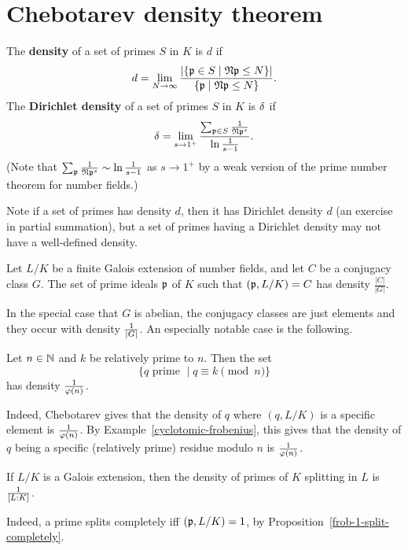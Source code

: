 \section{Chebotarev density theorem}
\begin{df}
The \textbf{density} of a set of primes $S$ in $K$ is $d$ if 
\[
d=\lim_{N\to \infty} \frac{|\{\mathfrak{p} \in S\mid \mathfrak{N}\mathfrak{p}\le N\}|}{\{\mathfrak{p}\mid \mathfrak{N}\mathfrak{p}\le N\}}.
\]
The \textbf{Dirichlet density} of a set of primes $S$ in $K$ is $\delta$ if 
\[
\delta=\lim_{s\to 1^+}\frac{\sum_{\mathfrak{p}\in S}\frac{1}{\mathfrak{N} \mathfrak{p}^s}}{\ln \frac{1}{s-1}}.
\]
(Note that $\sum_{\mathfrak{p}}\frac{1}{\mathfrak{N}\mathfrak{p}^s}\sim \ln \frac{1}{s-1}$ as $s\to 1^+$ by a weak version of the prime number theorem for number fields.)
\end{df}
Note if a set of primes has density $d$, then it has Dirichlet density $d$ (an exercise in partial summation), but a set of primes having a Dirichlet density may not have a well-defined density.
\begin{thm}
Let $L/K$ be a finite Galois extension of number fields, and let $C$ be a conjugacy class $G$. The set of prime ideals $\mathfrak{p}$ of $K$ such that $(\mathfrak{p},L/K)=C$ has density $\frac{|C|}{|G|}$.
\end{thm}
In the special case that $G$ is abelian, the conjugacy classes are just elements and they occur with density $\frac{1}{|G|}$. An especially notable case is the following.
\begin{ex}[Dirichlet]
Let $n\in \mathbb{N}$ and $k$ be relatively prime to $n$. Then the set
\[
\{q \text{ prime }\mid q\equiv k\pmod n\}
\]
has density $\frac{1}{\varphi(n)}$.

Indeed, Chebotarev gives that the density of $q$ where $(q,L/K)$ is a specific element is $\frac{1}{\varphi(n)}$.
By Example~\ref{cyclotomic-frobenius}, this gives that the density of $q$ being a specific (relatively prime) residue modulo $n$ is $\frac{1}{\varphi(n)}$.
\end{ex}
\begin{ex}
If $L/K$ is a Galois extension, then the density of primes of $K$ splitting in $L$ is $\frac{1}{[L:K]}$.

Indeed, a prime splits completely iff $(\mathfrak{p},L/K)=1$, by Proposition~\ref{frob-1-split-completely}.
\end{ex}

